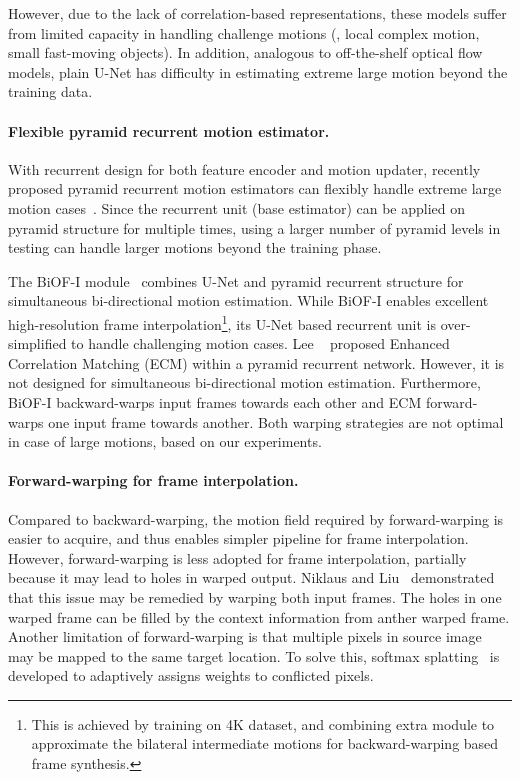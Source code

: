 \documentclass[10pt,twocolumn,letterpaper]{article}
\begin{document}
However, due to the lack of correlation-based representations, these models
suffer from limited capacity in handling challenge motions (\eg, local complex
motion, small fast-moving objects). In addition, analogous to off-the-shelf
optical flow models, plain U-Net has difficulty in estimating extreme large
motion beyond the training data.



\paragraph{Flexible pyramid recurrent motion estimator.} With recurrent design
for both feature encoder and motion updater, recently proposed pyramid recurrent
motion estimators can flexibly handle extreme large motion
cases~\cite{zhang2020flexible,sim2021xvfi,lee2022enhanced}.  Since the recurrent
unit (base estimator) can be applied on pyramid structure for multiple times,
using a larger number of pyramid levels in testing can handle larger motions
beyond the training phase.


The BiOF-I module~\cite{sim2021xvfi} combines U-Net and pyramid recurrent
structure for simultaneous bi-directional motion estimation.  While BiOF-I
enables excellent high-resolution frame interpolation\footnote{This is achieved
    by training on 4K dataset, and combining extra module to approximate the
bilateral intermediate motions for backward-warping based frame synthesis.}, its
U-Net based recurrent unit is over-simplified to handle challenging motion
cases.  Lee \etal~\cite{lee2022enhanced} proposed Enhanced Correlation Matching
(ECM) within a pyramid recurrent network. However, it is not designed for
simultaneous bi-directional motion estimation. Furthermore, BiOF-I
backward-warps input frames towards each other and ECM forward-warps one input
frame towards another. Both warping strategies are not optimal in case of large
motions, based on our experiments.



\paragraph{Forward-warping for frame interpolation.} Compared to
backward-warping, the motion field required by forward-warping is easier to
acquire, and thus enables simpler pipeline for frame interpolation. However,
forward-warping is less adopted for frame interpolation, partially because it
may lead to holes in warped output.  Niklaus and Liu~\cite{niklaus2018context}
demonstrated that this issue may be remedied by warping both input frames. The
holes in one warped frame can be filled by the context information from anther
warped frame.  Another limitation of forward-warping is that multiple pixels in
source image may be mapped to the same target location. To solve this, softmax
splatting~\cite{niklaus2020softmax} is developed to adaptively assigns weights
to conflicted pixels.
\end{document}
